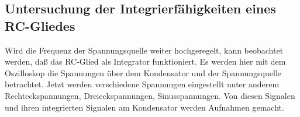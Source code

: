 \subsection{Untersuchung der Integrierfähigkeiten eines RC-Gliedes}

Wird die Frequenz der Spannungsquelle weiter hochgeregelt, kann
beobachtet werden, daß das RC-Glied als Integrator funktioniert. Es
werden hier mit dem Oszilloskop die Spannungen über dem Kondensator und
der Spannungsquelle betrachtet. Jetzt werden verschiedene Spannungen
eingestellt unter anderem Rechteckspannungen, Dreieckspannungen,
Sinusspannungen. Von diesen Signalen und ihren integrierten Signalen am
Kondensator werden Aufnahmen gemacht.
